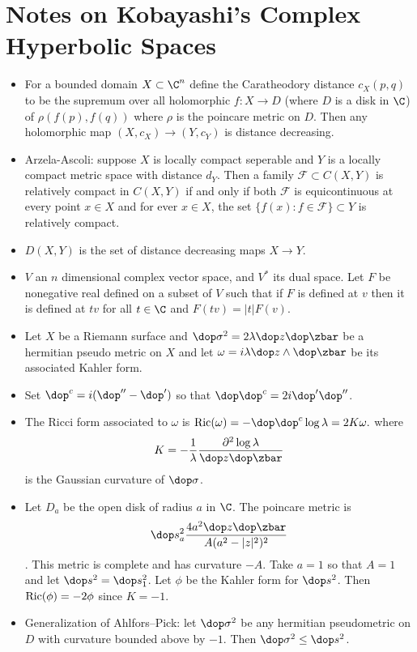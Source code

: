\documentclass[11pt]{amsart}
\begin{document}
\section{Notes on Kobayashi's Complex Hyperbolic Spaces}

\begin{itemize}
  \item For a bounded domain $X\subset \C^n$ define the Caratheodory distance $c_X(p,q)$ to be the supremum over all holomorphic $f:X \to D$ (where $D$ is a disk in $\C$)  of $\rho(f(p),f(q))$ where $\rho$ is the poincare metric on $D$. Then any holomorphic map $(X,c_X) \to (Y,c_Y)$ is distance decreasing. 
  \item Arzela-Ascoli: suppose $X$ is locally compact seperable and $Y$ is a locally compact metric space with distance $d_Y$. Then a family $\mathcal{F} \subset C(X,Y)$ is relatively compact in $C(X,Y)$ if and only if both $\mathcal{F}$ is equicontinuous at every point $x\in X$ and for ever $x\in X$, the set $\{ f(x): f\in \mathcal{F} \} \subset Y$ is relatively compact. 
  \item $D(X,Y)$ is the set of distance decreasing maps $X\to Y$. 
  \item $V$ an $n$ dimensional complex vector space, and $V^*$ its dual space. Let $F$ be nonegative real defined on a subset of $V$ such that if $F$ is defined at $v$ then it is defined at $tv$ for all $t\in \C$ and $F(tv)=|t| F(v)$.  
  \item Let $X$ be a Riemann surface and $\dop \sigma^2 = 2\lambda \dop z \dop \zbar$ be a hermitian pseudo metric on $X$ and let $\omega = i\lambda \dop z \wedge \dop \zbar$ be its associated Kahler form. 
  \item Set $\dop ^c= i(\dop '' - \dop ' )$ so that $\dop \dop ^c =2 i \dop' \dop''$. 
  \item The Ricci form associated to $\omega$ is $\Ric(\omega)= -\dop \dop^c \log \lambda = 2K\omega.$ where \[K= - \frac{1}{\lambda} \frac{\partial^2 \log \lambda }{\dop z \dop \zbar} \] is the Gaussian curvature of $\dop \sigma$. 
  \item Let $D_a$ be the open disk of radius $a$ in $\C$. The poincare metric is \[ \dop s_a^2 \frac{4a^2 \dop z \dop \zbar}{ A (a^2-|z|^2 )^2} \]. This metric is complete and has curvature $-A$. Take $a=1$ so that $A=1$ and let $\dop s^2 =\dop s_1^2$. Let $\phi$ be the Kahler form for $\dop s^2$. Then $\operatorname{Ric}(\phi) =-2\phi$ since $K=-1$.
  \item Generalization of Ahlfors--Pick: let $\dop \sigma^2$ be any hermitian pseudometric on $D$ with curvature bounded above by $-1$. Then $\dop \sigma^2 \leq \dop s^2$. 

\end{itemize}
\end{document}
